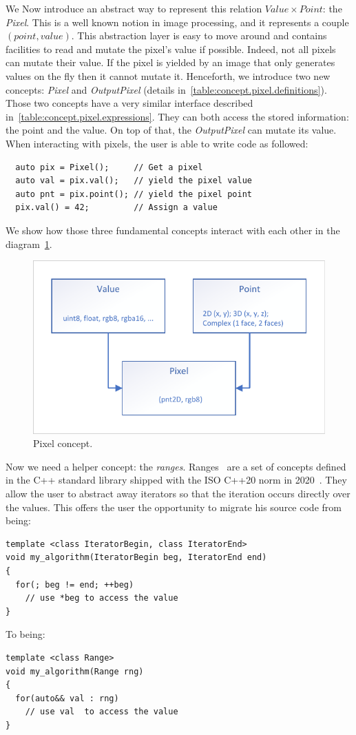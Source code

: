 We Now introduce an abstract way to represent this relation \(Value \times Point\): the \emph{Pixel}. This is a well
known notion in image processing, and it represents a couple \((point, value)\). This abstraction layer is easy to move
around and contains facilities to read and mutate the pixel's value if possible. Indeed, not all pixels can mutate their
value. If the pixel is yielded by an image that only generates values on the fly then it cannot mutate it. Henceforth,
we introduce two new concepts: \emph{Pixel} and \emph{OutputPixel} (details in~\cref{table:concept.pixel.definitions}).
Those two concepts have a very similar interface described in~\cref{table:concept.pixel.expressions}. They can both
access the stored information: the point and the value. On top of that, the \emph{OutputPixel} can mutate its value.
When interacting with pixels, the user is able to write code as followed:
\begin{verbatim}
  auto pix = Pixel();     // Get a pixel
  auto val = pix.val();   // yield the pixel value
  auto pnt = pix.point(); // yield the pixel point
  pix.val() = 42;         // Assign a value
\end{verbatim}

We show how those three fundamental concepts interact with each other in the\\
diagram~\cref{fig:concept.pixel}.

\begin{figure}[htbp]
  \centering
  \includegraphics[width=.8\linewidth]{../figures/concepts/pixel}
  \caption{Pixel concept.}
  \label{fig:concept.pixel}
\end{figure}

Now we need a helper concept: the \emph{ranges}.
Ranges~\parencite{niebler.2014.ranges,niebler.2018.ranges,niebler.2018.deepranges,niebler.2018.mergingranges} are a set
of concepts defined in the C++ standard library shipped with the ISO C++20 norm in 2020~\parencite{iso.2020.cpp}. They
allow the user to abstract away iterators so that the iteration occurs directly over the values. This offers the user
the opportunity to migrate his source code from being:
\begin{verbatim}
template <class IteratorBegin, class IteratorEnd>
void my_algorithm(IteratorBegin beg, IteratorEnd end)
{
  for(; beg != end; ++beg)
    // use *beg to access the value
}
\end{verbatim}
To being:
\begin{verbatim}
template <class Range>
void my_algorithm(Range rng)
{
  for(auto&& val : rng)
    // use val  to access the value
}
\end{verbatim}

